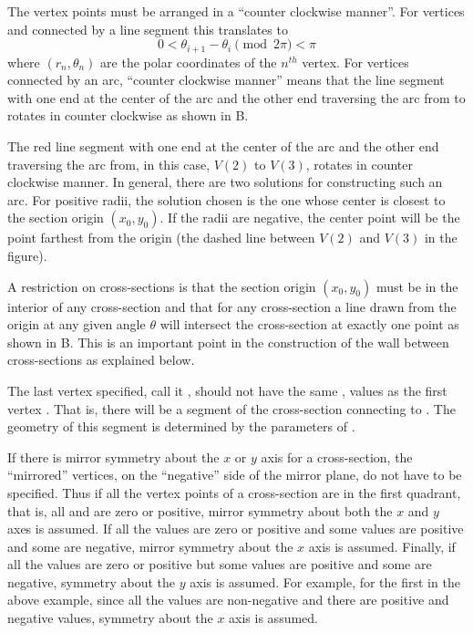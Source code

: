 The vertex points must be arranged in a ``counter clockwise manner''. 
For vertices  and  connected by a line segment
this translates to
\begin{equation}
  0 < \theta_{i+1} - \theta_{i} \pmod{2\pi} < \pi
\end{equation}
where $(r_n, \theta_n)$ are the polar coordinates of the $n^{th}$ vertex. For vertices connected by
an arc, ``counter clockwise manner'' means that the line segment with one end at the center of the
arc and the other end traversing the arc from  to  rotates in counter
clockwise as shown in B.

The red line segment with one end at the center of the arc and the other end traversing the arc
from, in this case, $V(2)$ to $V(3)$, rotates in counter clockwise manner. In general, there are two
solutions for constructing such an arc. For positive radii, the solution chosen is the one whose
center is closest to the section origin $(x_0, y_0)$. If the radii are negative, the center point
will be the point farthest from the origin (the dashed line between $V(2)$ and $V(3)$ in the
figure).

A restriction on cross-sections is that the section origin $(x_0, y_0)$ must be in the interior of
any cross-section and that for any cross-section a line drawn from the origin at any given angle
$\theta$ will intersect the cross-section at exactly one point as shown in
B. This is an important point in the construction of the wall between
cross-sections as explained below.

The last vertex specified, call it , should not have the same ,  values
as the first vertex . That is, there will be a segment of the cross-section connecting
 to . The geometry of this segment is determined by the parameters of
.

If there is mirror symmetry about the $x$ or $y$ axis for a cross-section, the ``mirrored''
vertices, on the ``negative'' side of the mirror plane, do not have to be specified. Thus if all the
vertex points of a cross-section are in the first quadrant, that is, all  and  are
zero or positive, mirror symmetry about both the $x$ and $y$ axes is assumed. If all the 
values are zero or positive and some  values are positive and some are negative, mirror
symmetry about the $x$ axis is assumed. Finally, if all the  values are zero or positive but
some  values are positive and some are negative, symmetry about the $y$ axis is assumed. For
example, for the first in the above example, since all the  values are non-negative and
there are positive and negative  values, symmetry about the $x$ axis is assumed.

